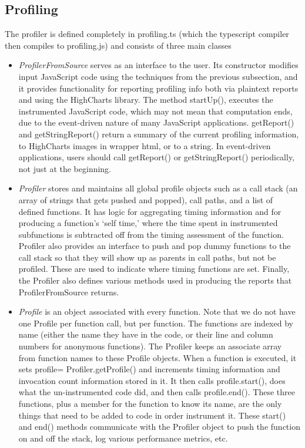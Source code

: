\documentclass[11pt]{article}
\begin{document}
\subsection{Profiling}
	The profiler is defined completely in profiling.ts (which the
        typescript compiler then compiles to profiling.js) 
and consists of three main classes
\begin{itemize}
\item \textit{ProfilerFromSource} serves as an interface to the
  user. Its constructor modifies input JavaScript code using the
  techniques from the previous subsection, and it provides
  functionality for reporting profiling info both via plaintext
  reports and using the HighCharts library. The method startUp(), executes the
  instrumented JavaScript code, which may not mean that computation
  ends, due to the event-driven nature of many JavaScript
  applications. getReport() and getStringReport() return a summary of
  the current profiling information, to HighCharts images in wrapper
  html, or to a string. In event-driven applications, users should
  call getReport() or getStringReport() periodically, not just at the
  beginning.

\item \textit{Profiler} stores and  maintains all global profile
  objects such as a call stack (an array of strings that gets pushed
  and popped), call paths, and a list of defined
  functions. It has logic for aggregating timing information and for
  producing a function's `self time,' where the time spent in
  instrumented subfunctions is subtracted off from the timing
  assessment of the function. Profiler also provides an interface to 
  push and pop dummy functions to the call stack so that they 
  will show up as parents in call paths, but not be profiled. 
  These are used to indicate where timing functions are set. 
  Finally, the Profiler also defines various methods used in producing the
 reports that ProfilerFromSource returns. 

\item \textit{Profile} is an object associated with every
  function. Note that we do not have one Profile per function call,
  but per function. The functions are indexed by name (either the name
  they have in the code, or their line and column numbers for
  anonymous functions). The Profiler keeps an associate array from
  function names to these Profile objects. When a function is
  executed, it sets profile= Profiler.getProfile() and increments timing
  information and invocation count information stored in it. It then
  calls profile.start(), does what the un-instrumented code did, and
  then calls profile.end(). These three functions, plus a member for
  the function to know its name, are the only things that need to be
  added to code in order instrument it. These start() and end()
  methods communicate with the Profiler object to push the function on
  and off the stack, log various performance metrics, etc.

\end{itemize}
\end{document}
